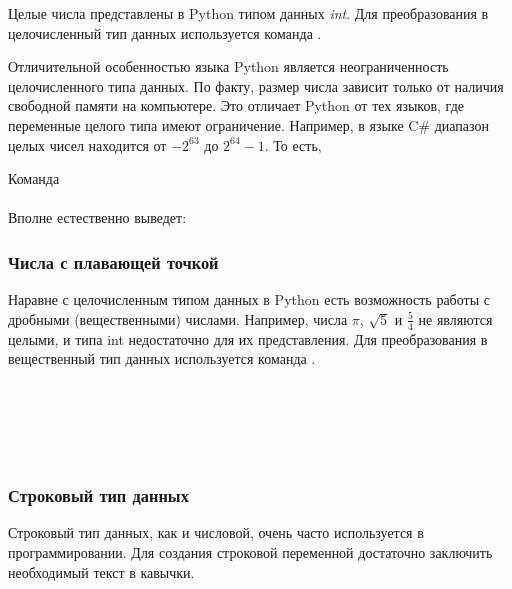 Целые числа представлены в Python типом данных \textit{int}. Для преобразования в целочисленный тип данных используется команда . 

Отличительной особенностью языка Python является неограниченность целочисленного типа данных. По факту, размер числа зависит только от наличия свободной памяти на компьютере. Это отличает Python от тех языков, где переменные целого типа имеют ограничение. Например, в языке C\# диапазон целых чисел находится от $-2^{63}$ до $2^{64} - 1$. То есть,

\begin{flushleft}
	Команда \\
	 \\
	Вполне естественно выведет:
\end{flushleft}

\subsubsection{Числа с плавающей точкой}

Наравне с целочисленным типом данных в Python есть возможность работы с дробными (вещественными) числами. Например, числа $\pi$, $\sqrt{5}$ и $\frac{5}{4}$ не являются целыми, и типа int недостаточно для их представления. Для преобразования в вещественный тип данных используется команда .

\begin{flushleft}
	 \\
	 \\
	\vspace{1cm}
	 \\ 
	 \\
\end{flushleft}

\subsubsection{Строковый тип данных}

Строковый тип данных, как и числовой, очень часто используется в программировании. Для создания строковой переменной достаточно заключить необходимый текст в кавычки.

\begin{flushleft}
	 \\ 
	 \\
\end{flushleft}

